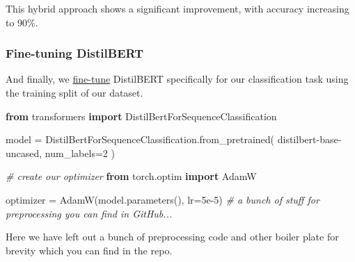 \documentclass[
]{article}
\newenvironment{Shaded}{}{}
\newcommand{\CommentTok}[1]{\textcolor[rgb]{0.38,0.63,0.69}{\textit{#1}}}
\newcommand{\DecValTok}[1]{\textcolor[rgb]{0.25,0.63,0.44}{#1}}
\newcommand{\FloatTok}[1]{\textcolor[rgb]{0.25,0.63,0.44}{#1}}
\newcommand{\ImportTok}[1]{\textcolor[rgb]{0.00,0.50,0.00}{\textbf{#1}}}
\newcommand{\NormalTok}[1]{#1}
\newcommand{\OperatorTok}[1]{\textcolor[rgb]{0.40,0.40,0.40}{#1}}
\newcommand{\StringTok}[1]{\textcolor[rgb]{0.25,0.44,0.63}{#1}}
\begin{document}
This hybrid approach shows a significant improvement, with accuracy
increasing to 90\%.

\subsubsection{Fine-tuning DistilBERT}\label{fine-tuning-distilbert}

And finally, we
\href{https://huggingface.co/docs/transformers/en/training}{fine-tune}
DistilBERT specifically for our classification task using the training split of our dataset.

\begin{Shaded}
\begin{Highlighting}[]
\ImportTok{from}\NormalTok{ transformers }\ImportTok{import}\NormalTok{ DistilBertForSequenceClassification}

\NormalTok{model }\OperatorTok{=}\NormalTok{ DistilBertForSequenceClassification.from\_pretrained(}
    \StringTok{\textquotesingle{}distilbert{-}base{-}uncased\textquotesingle{}}\NormalTok{, num\_labels}\OperatorTok{=}\DecValTok{2}
\NormalTok{)}

\CommentTok{\# create our optimizer}
\ImportTok{from}\NormalTok{ torch.optim }\ImportTok{import}\NormalTok{ AdamW}

\NormalTok{optimizer }\OperatorTok{=}\NormalTok{ AdamW(model.parameters(), lr}\OperatorTok{=}\FloatTok{5e{-}5}\NormalTok{)}
\CommentTok{\# a bunch of stuff for preprocessing you can find in GitHub...}
\end{Highlighting}
\end{Shaded}

Here we have left out a bunch of preprocessing code and other boiler
plate for brevity which you can find in the repo.
\end{document}
